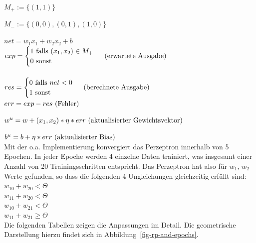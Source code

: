 $M_+ := \{(1, 1)\}$

$M_- := \{(0, 0), (0,1), (1,0)\}$

$net = w_1x_1 + w_2x_2 + b$\\

$exp = \begin{cases}
           1 \text{ falls } (x_1, x_2) \in M_+ \\
           0 \text{ sonst }
\end{cases}  \space \space \text{ (erwartete Ausgabe)}$
\\
\\

$res =  \begin{cases}
            0 \text{ falls } net < 0 \\
            1 \text{ sonst }
\end{cases}  \space \space \text{ (berechnete Ausgabe)}$\\

$err = exp - res  \space \space \text{ (Fehler)}$

$w^u = w + (x_1, x_2) * \eta * err  \space \space \text{ (aktualisierter Gewichtsvektor)}$

$b^u = b + \eta * err \space \space \text{ (aktualisierter Bias)}$\\


\noindent
Mit der o.a. Implementierung konvergiert das Perzeptron innerhalb von 5 Epochen.
In jeder Epoche werden 4 einzelne Daten trainiert, was insgesamt einer Anzahl von 20 Trainingsschritten entspricht.
Das Perzeptron hat also für $w_1$, $w_2$ Werte gefunden, so dass die folgenden 4 Ungleichungen gleichzeitig erfüllt sind:\\



$w_10 + w_20 < \Theta$\\

$w_11 + w_20 < \Theta$\\

$w_10 + w_21 < \Theta$\\

$w_11 + w_21 \geq \Theta$\\



Die folgenden Tabellen zeigen die Anpassungen im Detail.
Die geometrische Darstellung hierzu findet sich in Abbildung~\ref{fig-rp-and-epochs}.

